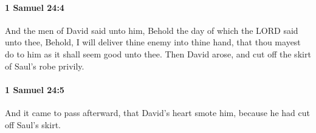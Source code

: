 		\paragraph{1 Samuel 24:4} %
			\label{1SAMUEL-24-4}

			And the men of David said unto him, Behold the day of which the LORD said unto thee, Behold, I will deliver thine enemy into thine hand, that thou mayest do to him as it shall seem good unto thee. Then David arose, and cut off the skirt of Saul’s robe privily.


		\paragraph{1 Samuel 24:5} %
			\label{1SAMUEL-24-5}

			And it came to pass afterward, that David’s heart smote him, because he had cut off Saul’s skirt.


